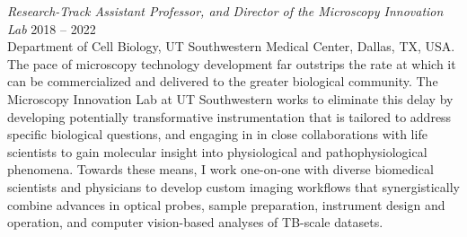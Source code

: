 {\sl Research-Track Assistant Professor, and Director of the Microscopy Innovation Lab} \hfill 2018 -- 2022 \\ 
Department of Cell Biology, UT Southwestern Medical Center, Dallas, TX, USA. \hfill \\
\forceindent The pace of microscopy technology development far outstrips the rate at which it can be commercialized and delivered to the greater biological community.  The Microscopy Innovation Lab at UT Southwestern works to eliminate this delay by developing potentially transformative instrumentation that is tailored to address specific biological questions, and engaging in in close collaborations with life scientists to gain molecular insight into physiological and pathophysiological phenomena. Towards these means, I work one-on-one with diverse biomedical scientists and physicians to develop custom imaging workflows that synergistically combine advances in optical probes, sample preparation, instrument design and operation, and computer vision-based analyses of TB-scale datasets. %


